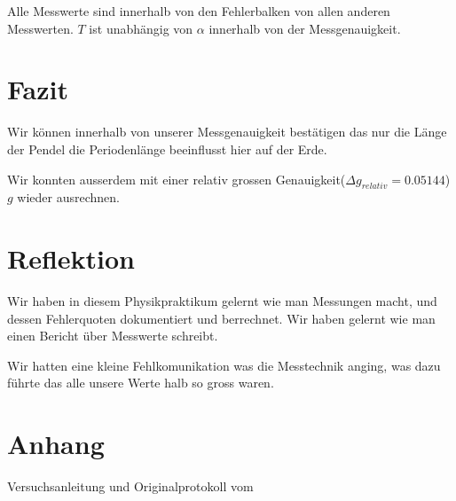 \documentclass[12pt, a4paper, twoside]{article}
\begin{document}
Alle Messwerte sind innerhalb von den Fehlerbalken von allen anderen Messwerten.
$T$ ist unabhängig von $\alpha$ innerhalb von der Messgenauigkeit.
\section{Fazit}
Wir können innerhalb von unserer Messgenauigkeit bestätigen das nur die Länge der Pendel die Periodenlänge beeinflusst hier auf der Erde.
\par
Wir konnten ausserdem mit einer relativ grossen Genauigkeit($\Delta g_{relativ} = 0.05144$) $g$ wieder ausrechnen.


\section{Reflektion}
Wir haben in diesem Physikpraktikum gelernt wie man Messungen macht, und dessen Fehlerquoten dokumentiert und berrechnet.
Wir haben gelernt wie man einen Bericht über Messwerte schreibt.

Wir hatten eine kleine Fehlkomunikation was die Messtechnik anging, was dazu führte das alle unsere Werte halb so gross waren.
\section{Anhang}
Versuchsanleitung und Originalprotokoll vom \labdate
\end{document}
